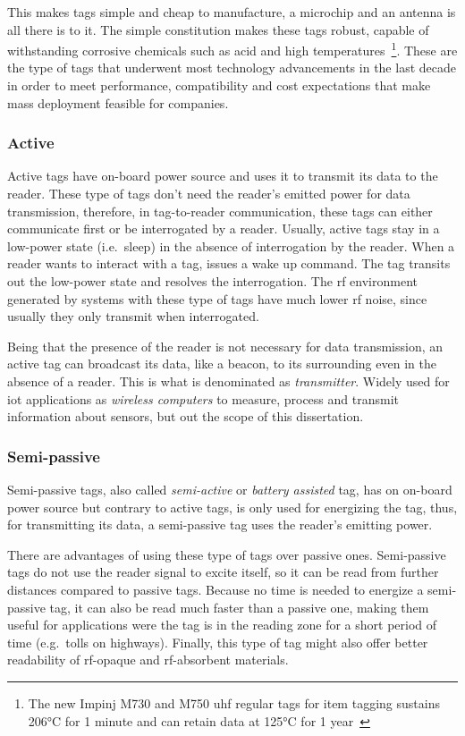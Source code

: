 This makes tags simple and cheap to manufacture, a microchip and an antenna is all there is to it.
The simple constitution makes these tags robust, capable of withstanding corrosive chemicals such as acid and high temperatures~\footnote{The new Impinj M730 and M750 \ac{uhf} regular tags for item tagging sustains \ang{206}C for 1 minute and can retain data at \ang{125}C for 1 year~\cite[Tab. 18]{ImpinjM730M750}}.
These are the type of tags that underwent most technology advancements in the last decade in order to meet performance, compatibility and cost expectations that make mass deployment feasible for companies.

\subsubsection{Active}

Active tags have on-board power source and uses it to transmit its data to the reader.
These type of tags don't need the reader's emitted power for data transmission, therefore, in tag-to-reader communication, these tags can either communicate first or be interrogated by a reader.
Usually, active tags stay in a low-power state (i.e.\ sleep) in the absence of interrogation by the reader. When a reader wants to interact with a tag, issues a wake up command. The tag transits out the low-power state and resolves the interrogation.
The \ac{rf} environment generated by systems with these type of tags have much lower \ac{rf} noise, since usually
 they only transmit when interrogated.

Being that the presence of the reader is not necessary for data transmission, an active tag can broadcast its data, like a beacon, to its surrounding even in the absence of a reader. This is what is denominated as \emph{transmitter}.
Widely used for \ac{iot} applications as \textit{wireless computers} to measure, process and transmit information about sensors, but out the scope of this dissertation.

\subsubsection{Semi-passive}

Semi-passive tags, also called \emph{semi-active} or \emph{battery assisted} tag, has on on-board power source but contrary to active tags, is only used for energizing the tag, thus, for transmitting its data, a semi-passive tag uses the reader's emitting power.

There are advantages of using these type of tags over passive ones.
Semi-passive tags do not use the reader signal to excite itself, so it can be read from further distances compared to passive tags. Because no time is needed to energize a semi-passive tag, it can also be read much faster than a passive one, making them useful for applications were the tag is in the reading zone for a short period of time (e.g.\ tolls on highways). Finally, this type of tag might also offer better readability of \ac{rf}-opaque and \ac{rf}-absorbent materials.

